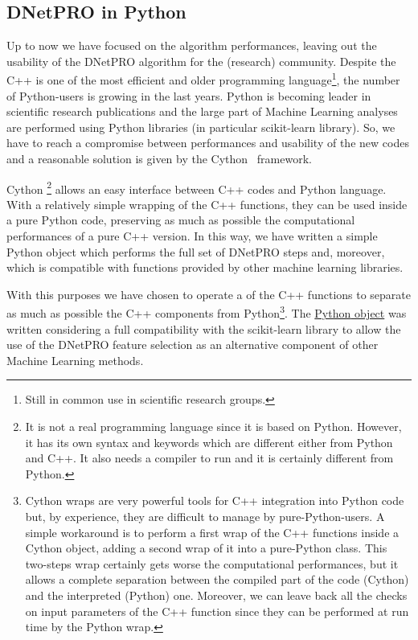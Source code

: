 \documentclass{standalone}
\begin{document}
\subsection[Python wrap]{DNetPRO in Python}\label{implementation:python}

Up to now we have focused on the algorithm performances, leaving out the usability of the \textsf{DNetPRO} algorithm for the (research) community.
Despite the \textsf{C++} is one of the most efficient and older programming language\footnote{
  Still in common use in scientific research groups.
}, the number of \textsf{Python}-users is growing in the last years.
\textsf{Python} is becoming leader in scientific research publications and the large part of Machine Learning analyses are performed using \textsf{Python} libraries (in particular \textsf{scikit-learn} library).
So, we have to reach a compromise between performances and usability of the new codes and a reasonable solution is given by the \textsf{Cython}~\cite{behnel2010cython} framework.

\textsf{Cython} \footnote{
  It is not a real programming language since it is based on \textsf{Python}.
  However, it has its own syntax and keywords which are different either from \textsf{Python} and \textsf{C++}.
  It also needs a compiler to run and it is certainly different from \textsf{Python}.
} allows an easy interface between \textsf{C++} codes and \textsf{Python} language.
With a relatively simple wrapping of the \textsf{C++} functions, they can be used inside a pure \textsf{Python} code, preserving as much as possible the computational performances of a pure \textsf{C++} version.
In this way, we have written a simple \textsf{Python} object which performs the full set of \textsf{DNetPRO} steps and, moreover, which is compatible with functions provided by other machine learning libraries.

With this purposes we have chosen to operate a  of the \textsf{C++} functions to separate as much as possible the \textsf{C++} components from \textsf{Python}\footnote{
  \textsf{Cython} wraps are very powerful tools for \textsf{C++} integration into \textsf{Python} code but, by experience, they are difficult to manage by pure-\textsf{Python}-users.
  A simple workaround is to perform a first wrap of the \textsf{C++} functions inside a \textsf{Cython} object, adding a second wrap of it into a pure-\textsf{Python} class.
  This two-steps wrap certainly gets worse the computational performances, but it allows a complete separation between the compiled part of the code (\textsf{Cython}) and the interpreted (\textsf{Python}) one.
  Moreover, we can leave back all the checks on input parameters of the \textsf{C++} function since they can be performed at run time by the \textsf{Python} wrap.
}.
The \href{https://github.com/Nico-Curti/DNetPRO/blob/master/DNetPRO/DNetPRO.py}{\textsf{Python} object} was written considering a full compatibility with the \textsf{scikit-learn} library to allow the use of the \textsf{DNetPRO} feature selection as an alternative component of other Machine Learning methods.
\end{document}
